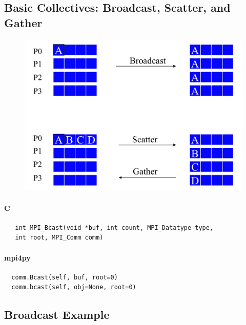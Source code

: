 \documentclass{article}
\begin{document}
    \subsection{Basic Collectives: Broadcast, Scatter, and
Gather}\label{basic-collectives-broadcast-scatter-and-gather}

\begin{figure}[htbp]
\centering
\includegraphics{../figures/broadcast_scatter_gather.png}
\end{figure}

    \paragraph{C}\label{c}

\begin{verbatim}
   int MPI_Bcast(void *buf, int count, MPI_Datatype type, 
   int root, MPI_Comm comm)
\end{verbatim}

\paragraph{mpi4py}\label{mpi4py}

\begin{verbatim}
  comm.Bcast(self, buf, root=0)
  comm.bcast(self, obj=None, root=0)
\end{verbatim}

    \subsection{Broadcast Example}\label{broadcast-example}
\end{document}
